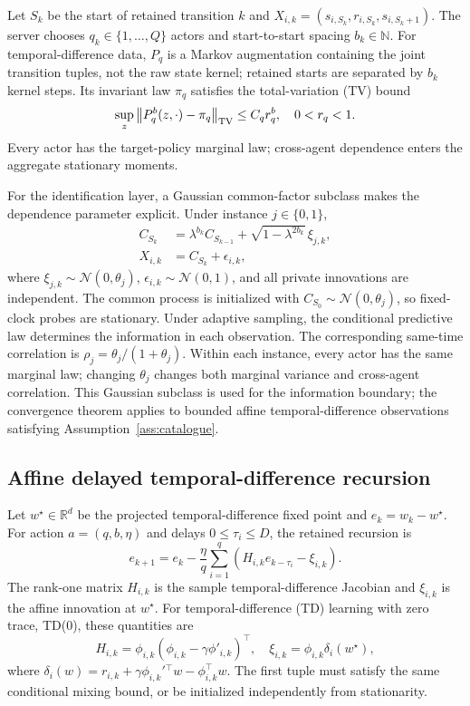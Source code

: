 \documentclass[journal]{IEEEtran}
\newcommand{\R}{\mathbb{R}}
\begin{document}
Let $S_k$ be the start of retained transition $k$ and $X_{i,k}=(s_{i,S_k},r_{i,S_k},s_{i,S_k+1})$.
The server chooses $q_k\in\{1,\ldots,Q\}$ actors and start-to-start spacing $b_k\in\mathbb N$.
For temporal-difference data, $P_q$ is a Markov augmentation containing the joint transition tuples, not the raw state kernel; retained starts are separated by $b_k$ kernel steps.
Its invariant law $\pi_q$ satisfies the total-variation (TV) bound
\begin{equation}
\sup_z\left\|P_q^b(z,\cdot)-\pi_q\right\|_{\rm TV}\le C_qr_q^b,
\quad 0<r_q<1.
\label{eq:mixing}
\end{equation}
Every actor has the target-policy marginal law; cross-agent dependence enters the aggregate stationary moments.

For the identification layer, a Gaussian common-factor subclass makes the dependence parameter explicit.
Under instance $j\in\{0,1\}$,
\begin{align}
C_{S_k}&=\lambda^{b_k}C_{S_{k-1}}+\sqrt{1-\lambda^{2b_k}}\,\xi_{j,k},\nonumber\\
X_{i,k}&=C_{S_k}+\epsilon_{i,k},
\label{eq:common-factor}
\end{align}
where $\xi_{j,k}\sim\mathcal{N}(0,\theta_j)$, $\epsilon_{i,k}\sim\mathcal{N}(0,1)$, and all private innovations are independent.
The common process is initialized with $C_{S_0}\sim\mathcal N(0,\theta_j)$, so fixed-clock probes are stationary.
Under adaptive sampling, the conditional predictive law determines the information in each observation.
The corresponding same-time correlation is $\rho_j=\theta_j/(1+\theta_j)$.
Within each instance, every actor has the same marginal law; changing $\theta_j$ changes both marginal variance and cross-agent correlation.
This Gaussian subclass is used for the information boundary; the convergence theorem applies to bounded affine temporal-difference observations satisfying Assumption~\ref{ass:catalogue}.

\subsection{Affine delayed temporal-difference recursion}
Let $w^\star\in\R^d$ be the projected temporal-difference fixed point and $e_k=w_k-w^\star$.
For action $a=(q,b,\eta)$ and delays $0\le\tau_i\le D$, the retained recursion is
\begin{equation}
e_{k+1}=e_k-\frac{\eta}{q}\sum_{i=1}^{q}\left(H_{i,k}e_{k-\tau_i}-\xi_{i,k}\right).
\label{eq:affine-td}
\end{equation}
The rank-one matrix $H_{i,k}$ is the sample temporal-difference Jacobian and $\xi_{i,k}$ is the affine innovation at $w^\star$.
For temporal-difference (TD) learning with zero trace, TD(0), these quantities are
\begin{equation}
H_{i,k}=\phi_{i,k}(\phi_{i,k}-\gamma\phi'_{i,k})^\top,
\quad
\xi_{i,k}=\phi_{i,k}\delta_i(w^\star),
\label{eq:td-components}
\end{equation}
where $\delta_i(w)=r_{i,k}+\gamma\phi_{i,k}'{}^\top w-\phi_{i,k}^\top w$.
The first tuple must satisfy the same conditional mixing bound, or be initialized independently from stationarity.
\end{document}
